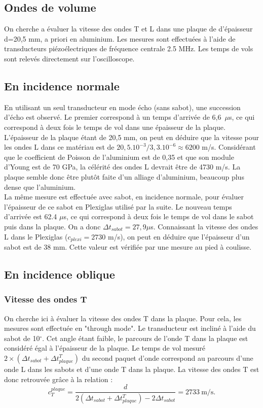 \documentclass[twoside]{article}
\begin{document}
\begin{multicols}{2}
\section{Ondes de volume}

On cherche a évaluer la vitesse des ondes T et L dans une plaque de d'épaisseur d=20,5 mm, a priori en aluminium. Les mesures sont effectuées à l'aide de  transducteurs piézoélectriques de fréquence centrale 2.5 MHz. Les temps de vols sont relevés directement sur l'oscilloscope. 

\subsection{En incidence normale}

En utilisant un seul transducteur en mode écho (sans sabot), une succession d'écho est observé. Le premier correspond à un temps d'arrivée de 6,6~$\mu$s, ce qui correspond à deux fois le temps de vol dans une épaisseur de la plaque. L'épaisseur de la plaque étant de 20,5 mm, on peut en déduire que la vitesse pour les ondes L dans ce matériau est de $20,5.10^{-3}/3,3.10^{-6}\approx6200$ m/s. Considérant que le coefficient de Poisson de l'aluminium est de 0,35 et que son module d'Young est de 70 GPa, la célérité des ondes L devrait être de 4730 m/s. La plaque semble donc être plutôt faite d'un alliage d'aluminium, beaucoup plus dense que l'aluminium.\\

La même mesure est effectuée avec sabot, en incidence normale, pour évaluer l'épaisseur de ce sabot en Plexiglas utilisé par la suite. Le nouveau temps d'arrivée est 62.4 $\mu$s, ce qui correspond à deux fois le temps de vol dans le sabot puis dans la plaque. On a donc $\Delta t_{sabot} =27,9 \mu$s. Connaissant la vitesse des ondes L dans le Plexiglas ($c_{plexi}=2730$ m/s), on peut en déduire que l'épaisseur d'un sabot est de 38 mm. Cette valeur est vérifiée par une mesure au pied à coulisse.

\subsection{En incidence oblique}
	\subsubsection{Vitesse des ondes T}
	On cherche ici à évaluer la vitesse des ondes T dans la plaque. Pour cela, les mesures sont effectuée en "through mode".
	Le transducteur est incliné à l'aide du sabot de 10$^{\circ}$. Cet angle étant faible, le parcours de l'onde T dans la plaque est considéré égal à l'épaisseur de la plaque. Le temps de vol mesuré $2\times(\Delta t_{sabot}+\Delta t_{plaque}^T)$ du second paquet d'onde correspond au parcours d'une onde L dans les sabots et d'une onde T dans la plaque. La vitesse des ondes T est donc retrouvée grâce à la relation : 
	$$c_{T}^{plaque}=\frac{d}{2(\Delta t_{sabot}+\Delta t_{plaque}^T)-2\Delta t_{sabot}}=2733~ \text{m/s.}$$
	

\end{multicols}
\end{document}
